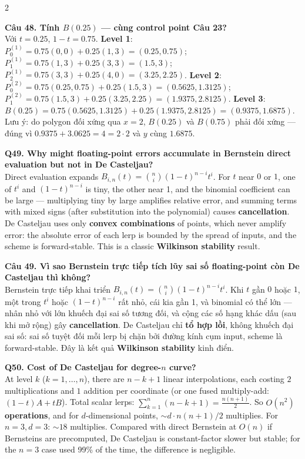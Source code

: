 \begin{paracol}{2}
\switchcolumn

\textbf{Câu 48. Tính $B(0.25)$ — cùng control point Câu 23?}\\
Với $t=0.25$, $1-t=0.75$.
\textbf{Level 1}: $P_0^{(1)}=0.75(0,0)+0.25(1,3)=(0.25, 0.75)$; $P_1^{(1)}=0.75(1,3)+0.25(3,3)=(1.5, 3)$; $P_2^{(1)}=0.75(3,3)+0.25(4,0)=(3.25, 2.25)$.
\textbf{Level 2}: $P_0^{(2)}=0.75(0.25,0.75)+0.25(1.5,3)=(0.5625, 1.3125)$; $P_1^{(2)}=0.75(1.5,3)+0.25(3.25,2.25)=(1.9375, 2.8125)$.
\textbf{Level 3}: $B(0.25)=0.75(0.5625,1.3125)+0.25(1.9375,2.8125)=(0.9375, 1.6875)$.
Lưu ý: do polygon đối xứng qua $x=2$, $B(0.25)$ và $B(0.75)$ phải đối xứng — đúng vì $0.9375 + 3.0625 = 4 = 2\cdot 2$ và $y$ cùng $1.6875$. \checkmark

\switchcolumn*

\textbf{Q49. Why might floating-point errors accumulate in Bernstein direct evaluation but not in De Casteljau?}\\
Direct evaluation expands $B_{i,n}(t)=\binom{n}{i}(1-t)^{n-i}t^i$. For $t$ near $0$ or $1$, one of $t^i$ and $(1-t)^{n-i}$ is tiny, the other near 1, and the binomial coefficient can be large — multiplying tiny by large amplifies relative error, and summing terms with mixed signs (after substitution into the polynomial) causes \textbf{cancellation}. De Casteljau uses only \textbf{convex combinations} of points, which never amplify error: the absolute error of each lerp is bounded by the spread of inputs, and the scheme is forward-stable. This is a classic \textbf{Wilkinson stability} result.

\switchcolumn

\textbf{Câu 49. Vì sao Bernstein trực tiếp tích lũy sai số floating-point còn De Casteljau thì không?}\\
Bernstein trực tiếp khai triển $B_{i,n}(t)=\binom{n}{i}(1-t)^{n-i}t^i$. Khi $t$ gần $0$ hoặc $1$, một trong $t^i$ hoặc $(1-t)^{n-i}$ rất nhỏ, cái kia gần 1, và binomial có thể lớn — nhân nhỏ với lớn khuếch đại sai số tương đối, và cộng các số hạng khác dấu (sau khi mở rộng) gây \textbf{cancellation}. De Casteljau chỉ \textbf{tổ hợp lồi}, không khuếch đại sai số: sai số tuyệt đối mỗi lerp bị chặn bởi đường kính cụm input, scheme là forward-stable. Đây là kết quả \textbf{Wilkinson stability} kinh điển.

\switchcolumn*

\textbf{Q50. Cost of De Casteljau for degree-$n$ curve?}\\
At level $k$ ($k=1,\ldots,n$), there are $n-k+1$ linear interpolations, each costing $2$ multiplications and $1$ addition per coordinate (or one fused multiply-add: $(1-t)A + tB$). Total scalar lerps: $\sum_{k=1}^{n} (n-k+1) = \tfrac{n(n+1)}{2}$. So \textbf{$O(n^2)$ operations}, and for $d$-dimensional points, $\sim d \cdot n(n+1)/2$ multiplies. For $n=3, d=3$: $\sim 18$ multiplies. Compared with direct Bernstein at $O(n)$ if Bernsteins are precomputed, De Casteljau is constant-factor slower but stable; for the $n=3$ case used 99\% of the time, the difference is negligible.


\end{paracol}
